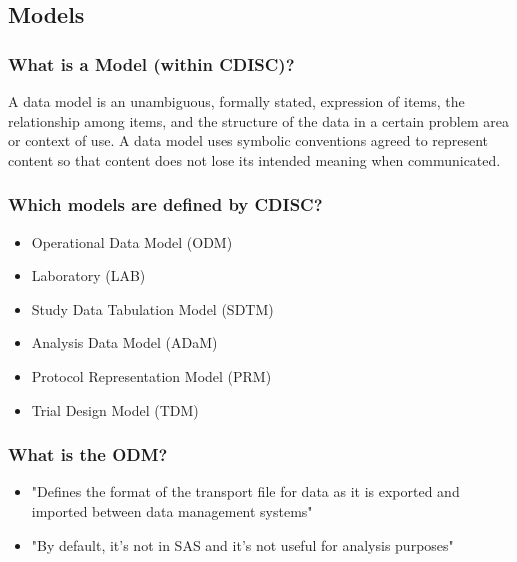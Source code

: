 \documentclass{beamer}
\begin{document}


\subsection[Models]{Models}

\begin{frame}
  \frametitle{What is a Model (within CDISC)?}

	\begin{definition}
	A \alert{data model} is an unambiguous, formally stated, expression of items, the relationship among items, 
	and the structure of the data in a certain problem area or context of use. 
    A data model uses symbolic conventions agreed to represent content so that content does not lose its 
    intended meaning when communicated.
	\end{definition}
\end{frame}

\begin{frame}
  \frametitle{Which models are defined by CDISC?}

  \begin{itemize}
		\item Operational Data Model (ODM)
		\item Laboratory (LAB)
		\item \alert{Study Data Tabulation Model (SDTM)}
		\item \alert{Analysis Data Model (ADaM)}
		\item Protocol Representation Model (PRM)
		\item Trial Design Model (TDM)
  \end{itemize}
\end{frame}


\begin{frame}
  \frametitle{What is the ODM?}

  \begin{itemize}
		\item "Defines the format of the transport file for data as it is exported and imported between
		      data management systems"
		\item "By default, it's not in SAS and it's not useful for analysis purposes"
  \end{itemize}
\end{frame}
\end{document}

